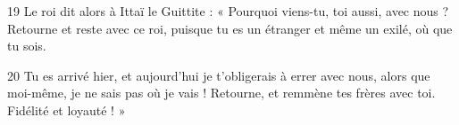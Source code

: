 
19 Le roi dit alors à Ittaï le Guittite : « Pourquoi viens-tu, toi aussi, avec nous ? Retourne et reste avec ce roi, puisque tu es un étranger et même un exilé, où que tu sois.

20 Tu es arrivé hier, et aujourd’hui je t’obligerais à errer avec nous, alors que moi-même, je ne sais pas où je vais ! Retourne, et remmène tes frères avec toi. Fidélité et loyauté ! »